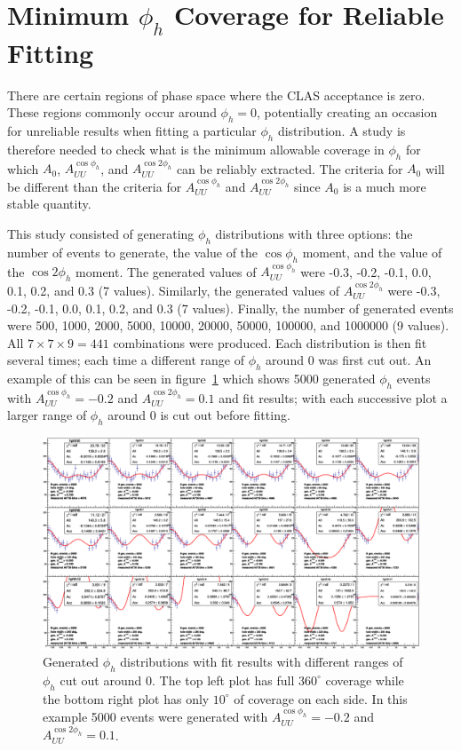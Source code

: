 \clearpage %

\section{Minimum $\phi_h$ Coverage for Reliable Fitting}
\label{sec:minPhihCoverage}
There are certain regions of phase space where the CLAS acceptance is zero.
These regions commonly occur around $\phi_h = 0$, potentially creating an occasion for unreliable results when fitting a particular $\phi_h$ distribution.
A study is therefore needed to check what is the minimum allowable coverage in $\phi_h$ for which $A_0$, $A_{UU}^{\cos\phi_h}$, and $A_{UU}^{\cos 2\phi_h}$ can be reliably extracted.
The criteria for $A_0$ will be different than the criteria for $A_{UU}^{\cos\phi_h}$ and $A_{UU}^{\cos 2\phi_h}$ since $A_0$ is a much more stable quantity.

This study consisted of generating $\phi_h$ distributions with three options: the number of events to generate, the value of the $\cos\phi_h$ moment, and the value of the $\cos 2\phi_h$ moment.
The generated values of $A_{UU}^{\cos\phi_h}$ were -0.3, -0.2, -0.1, 0.0, 0.1, 0.2, and 0.3 (7 values).
Similarly, the generated values of $A_{UU}^{\cos 2\phi_h}$ were -0.3, -0.2, -0.1, 0.0, 0.1, 0.2, and 0.3 (7 values).
Finally, the number of generated events were 500, 1000, 2000, 5000, 10000, 20000, 50000, 100000, and 1000000 (9 values).
All $7 \times 7 \times 9 = 441$ combinations were produced.
Each distribution is then fit several times; each time a different range of $\phi_h$ around $0$ was first cut out.
An example of this can be seen in figure~\ref{fig:holeWidthStudyExample} which shows 5000 generated $\phi_h$ events with $A_{UU}^{\cos\phi_h} = -0.2$ and $A_{UU}^{\cos 2\phi_h} = 0.1$ and fit results; with each successive plot a larger range of $\phi_h$ around $0$ is cut out before fitting.
%
\begin{figure}
\centering
\includegraphics[width=8.5in]{figures/holeWidthStudyExample.png}
\caption{Generated $\phi_h$ distributions with fit results with different ranges of $\phi_h$ cut out around $0$. The top left plot has full $360^\circ$ coverage while the bottom right plot has only $10^\circ$ of coverage on each side. In this example 5000 events were generated with $A_{UU}^{\cos\phi_h} = -0.2$ and $A_{UU}^{\cos 2\phi_h} = 0.1$.}
\label{fig:holeWidthStudyExample}
\end{figure}

